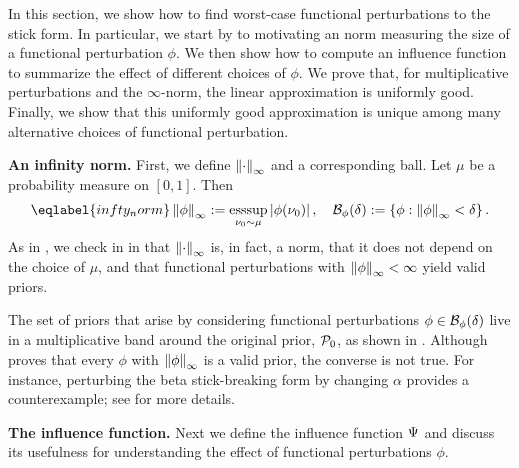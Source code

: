 In this section, we show how to find worst-case functional perturbations to the
stick form. In particular, we start by  to motivating an norm measuring the size
of a functional perturbation $\phi$. We then show how to compute an influence
function to summarize the effect of different choices of $\phi$. We prove that,
for multiplicative perturbations and the $\infty$-norm, the linear approximation
is uniformly good. Finally, we show that this uniformly good approximation is
unique among many alternative choices of functional perturbation.

\noindent \textbf{An infinity norm.}
First, we define $\left\Vert\cdot\right\Vert_{\infty}$ and a corresponding ball.
Let $\mu$ be a probability measure on $[0,1]$. Then
\begin{equation} \eqlabel{infty_norm}
	\norminf{\phi} := \esssup_{\nu_0 \sim \mu} \abs{\phi(\nu_0)},
	\quad \ball_\phi(\delta) := \left\{ \phi: \norminf{\phi} <
\delta \right\}.
\end{equation}
%
As in \citep{gustafson:1996:marginal}, we check in  in
 that $\left\Vert\cdot\right\Vert_{\infty}$ is, in fact, a norm, that
it does not depend on the choice of $\mu$, and that functional perturbations
with $\left\Vert\phi\right\Vert_{\infty} < \infty$ yield valid priors. 

The set of priors that arise by considering functional perturbations $\phi \in
\mathcal{B}_\phi(\delta)$ live in a multiplicative band around the original prior,
$\mathcal{P}_{0}$, as shown in . Although 
proves that every $\phi$ with $\left\Vert\phi\right\Vert_{\infty}$ is a valid prior, the converse is
not true. For instance, perturbing the beta stick-breaking form by changing
$\alpha$ provides a counterexample; see  for more details.

\FunctionBallFig{}

\noindent \textbf{The influence function.}
%
Next we define the influence function $\Psi$ and discuss its usefulness for
understanding the effect of functional perturbations $\phi$.

